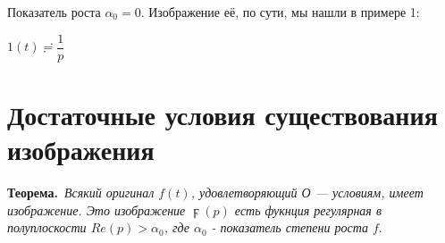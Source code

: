 \documentclass[a4paper, 12pt]{report}
\begin{document}
Показатель роста $\alpha_0 = 0$. Изображение её, по сути, мы нашли в примере 1:

\begin{center}
    $1(t) \risingdotseq \dfrac{1}{p}$
\end{center}
\par\bigskip



    \section{Достаточные условия существования изображения}

\textbf{Теорема.}\ \textit{Всякий оригинал $f(t)$, удовлетворяющий О --- условиям, имеет изображение. Это изображение $\digamma(p)$ есть фукнция регулярная в полуплоскости $Re(p) > \alpha_0$, где $\alpha_0$ - показатель степени роста $f$}.
\end{document}
